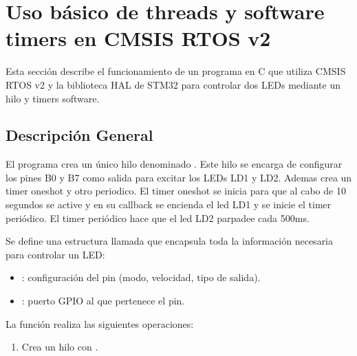 \documentclass[letterpaper,10pt,english]{sphinxmanual}
\begin{document}
\sphinxstepscope


\chapter{Uso básico de threads y software timers en CMSIS RTOS v2}
\label{\detokenize{ejemplothreads-software-timers:uso-basico-de-threads-y-software-timers-en-cmsis-rtos-v2}}\label{\detokenize{ejemplothreads-software-timers::doc}}
\sphinxAtStartPar
Esta sección describe el funcionamiento de un programa en C que utiliza CMSIS RTOS v2 y la biblioteca HAL de STM32 para controlar dos LEDs mediante un hilo y timers software.


\section{Descripción General}
\label{\detokenize{ejemplothreads-software-timers:descripcion-general}}
\sphinxAtStartPar
El programa crea un único hilo denominado . Este hilo se encarga de configurar los pines B0 y B7 como salida para excitar los LEDs LD1 y LD2. Ademas crea un timer one\sphinxhyphen{}shot y otro periodico.
El timer one\sphinxhyphen{}shot se inicia para que al cabo de 10 segundos se active y en su callback se encienda el led LD1 y se inicie el timer periódico. El timer periódico hace que el led LD2 parpadee cada 500ms.

\sphinxAtStartPar
Se define una estructura llamada  que encapsula toda la información necesaria para controlar un LED:
\begin{itemize}
\item {} 
\sphinxAtStartPar
{}: configuración del pin (modo, velocidad, tipo de salida).

\item {} 
\sphinxAtStartPar
{}: puerto GPIO al que pertenece el pin.

\end{itemize}

\sphinxAtStartPar
La función  realiza las siguientes operaciones:
\begin{enumerate}
%
\item {} 
\sphinxAtStartPar
Crea un hilo  con .

\end{enumerate}
\end{document}
